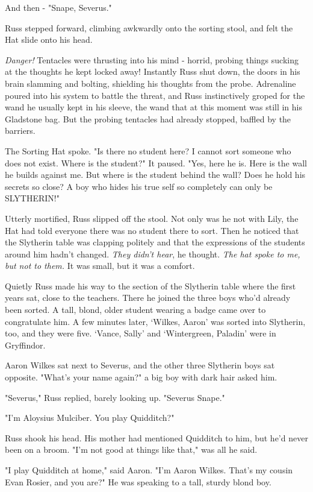 And then - "Snape, Severus."

Russ stepped forward, climbing awkwardly onto the sorting stool, and felt the Hat slide onto his head.

\emph{Danger!} Tentacles were thrusting into his mind - horrid, probing things sucking at the thoughts he kept locked away! Instantly Russ shut down, the doors in his brain slamming and bolting, shielding his thoughts from the probe. Adrenaline poured into his system to battle the threat, and Russ instinctively groped for the wand he usually kept in his sleeve, the wand that at this moment was still in his Gladstone bag. But the probing tentacles had already stopped, baffled by the barriers.

The Sorting Hat spoke. "Is there no student here? I cannot sort someone who does not exist. Where is the student?" It paused. "Yes, here he is. Here is the wall he builds against me. But where is the student behind the wall? Does he hold his secrets so close? A boy who hides his true self so completely can only be{\el} SLYTHERIN!"

Utterly mortified, Russ slipped off the stool. Not only was he not with Lily, the Hat had told everyone there was no student there to sort. Then he noticed that the Slytherin table was clapping politely and that the expressions of the students around him hadn't changed. \emph{They didn't hear}, he thought. \emph{The hat spoke to me, but not to them.} It was small, but it was a comfort.

Quietly Russ made his way to the section of the Slytherin table where the first years sat, close to the teachers. There he joined the three boys who'd already been sorted. A tall, blond, older student wearing a badge came over to congratulate him. A few minutes later, `Wilkes, Aaron' was sorted into Slytherin, too, and they were five. `Vance, Sally' and `Wintergreen, Paladin' were in Gryffindor.

Aaron Wilkes sat next to Severus, and the other three Slytherin boys sat opposite. "What's your name again?" a big boy with dark hair asked him.

"Severus," Russ replied, barely looking up. "Severus{\el} Snape."

"I'm Aloysius Mulciber. You play Quidditch?"

Russ shook his head. His mother had mentioned Quidditch to him, but he'd never been on a broom. "I'm not{\el} good at things like{\el} that," was all he said.

"I play Quidditch at home," said Aaron. "I'm Aaron Wilkes. That's my cousin Evan Rosier, and you are{\el}?" He was speaking to a tall, sturdy blond boy.


